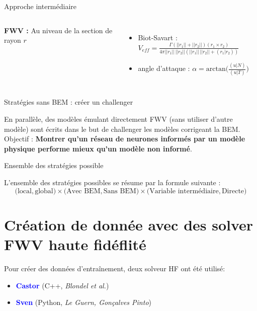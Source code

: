 \documentclass[
11pt,notheorems,hyperref={pdfauthor=whatever}
]{beamer}
\begin{document}
\begin{frame}{Approche intermédiaire}
\begin{center}
\begin{columns}[c]
        \textbf{FWV :}
        Au niveau de la section de rayon $r$ 
        \begin{itemize}\small
            \item Biot-Savart :  $V_{eff} = \frac{\Gamma(||r_1|| + ||r_2||)(r_1 \times r_2)}{4\pi ||r_1|| \, ||r_2||(||r_1||\,||r_2|| + (r_1 | r_2))}$
            \item angle d'attaque :  $\alpha = \text{arctan}\bigl(\frac{(u|N)}{(u|T)}\bigr)$
        \end{itemize}
    \end{columns}    
    \end{center}
\end{frame}

\begin{frame}{Stratégies sans BEM : créer un challenger}
    \begin{center}
    En parallèle, des modèles émulant directement FWV (sans utiliser d'autre modèle) sont écrits dans le but de challenger les modèles corrigeant la BEM.\\ 
    Objectif : \textbf{Montrer qu'un réseau de neurones informés par un modèle physique performe mieux qu'un modèle non informé}.
    \end{center}
\end{frame}

\begin{frame}{Ensemble des stratégies possible}
    \begin{center}
        L'ensemble des stratégies possibles se résume par la formule suivante : 
        \[
        \bigl(\text{local}, \text{global}\bigr) \times \bigl(\text{Avec BEM}, \text{Sans BEM}\bigr) \times \bigl(\text{Variable intermédiaire}, \text{Directe}\bigr)
        \]
    \end{center}
\end{frame}

\section{Création de donnée avec des solver FWV haute fidéflité}
   
\begin{frame}

    \begin{center}
        Pour créer des données d'entraînement, deux solveur HF ont été utilisé: 
        \begin{itemize}
            \item \textcolor{blue}{\textbf{Castor}} (C++, \textit{Blondel et al.})
            \item \textcolor{blue}{\textbf{Sven}} (Python, \textit{Le Guern, Gonçalves Pinto})
        \end{itemize}        
    \end{center}
    
\end{frame}
\end{document}

